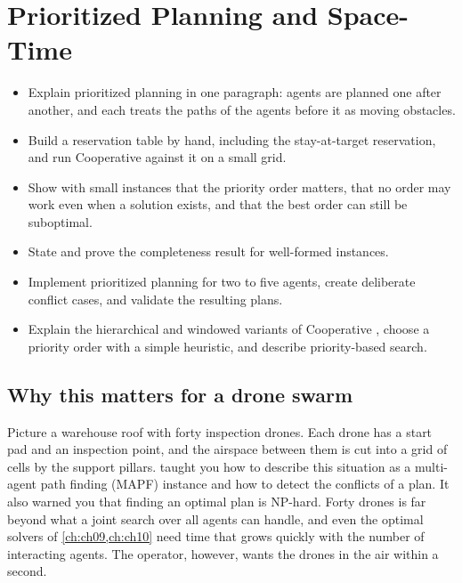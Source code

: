 \chapter{Prioritized Planning and Space-Time \astar}
\label{ch:ch08}

\begin{objectives}
\begin{itemize}
  \item Explain prioritized planning in one paragraph: agents are planned one after
        another, and each treats the paths of the agents before it as moving obstacles.
  \item Build a reservation table by hand, including the stay-at-target reservation, and
        run Cooperative \astar against it on a small grid.
  \item Show with small instances that the priority order matters, that no order may
        work even when a solution exists, and that the best order can still be suboptimal.
  \item State and prove the completeness result for well-formed instances.
  \item Implement prioritized planning for two to five agents, create deliberate conflict
        cases, and validate the resulting plans.
  \item Explain the hierarchical and windowed variants of Cooperative \astar, choose a
        priority order with a simple heuristic, and describe priority-based search.
\end{itemize}
\end{objectives}

\section{Why this matters for a drone swarm}
\label{sec:ch08-motivation}

Picture a warehouse roof with forty inspection drones. Each drone has a start pad and an
inspection point, and the airspace between them is cut into a grid of cells by the
support pillars.  taught you how to describe this situation as a
multi-agent path finding (MAPF) instance and how to detect the conflicts of
a plan. It also warned you that finding an optimal plan is NP-hard. Forty drones is far
beyond what a joint search over all agents can handle, and even the optimal solvers of
\cref{ch:ch09,ch:ch10} need time that grows quickly with the number of interacting
agents. The operator, however, wants the drones in the air within a second.

